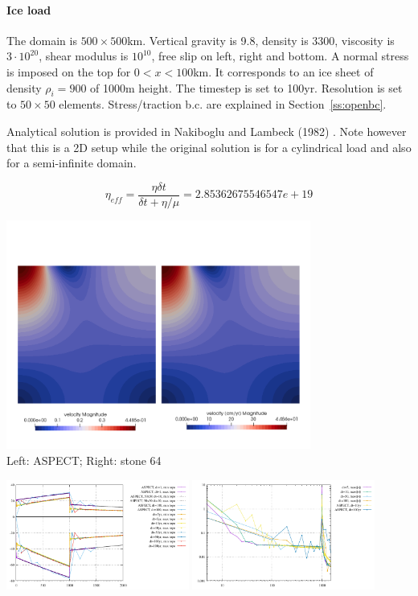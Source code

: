 \newpage
\paragraph{Ice load}

The domain is $500\times500$km. Vertical gravity is 9.8, density is 3300, viscosity 
is $3\cdot10^{20}$, shear modulus is $10^{10}$, free slip on left, right and bottom. 
A normal stress is imposed on the top for $0<x<100$km. It corresponds to 
an ice sheet of density $\rho_i=900$ of 1000m height. 
The timestep is set to 100yr. Resolution is set to $50\times50$ elements.
Stress/traction b.c. are explained in Section~\ref{ss:openbc}.

Analytical solution is provided in Nakiboglu and Lambeck (1982) \cite{nala82}. 
Note however that this is a 2D setup while the original solution is for a 
cylindrical load and also for a semi-infinite domain.

\[
\eta_{eff} = \frac{\eta \delta t}{\delta t + \eta/\mu}
= 2.85362675546547e+19
\]

\begin{center}
\includegraphics[width=10cm]{python_codes/fieldstone_64/results/icesheetload/vel}\\
{\captionfont Left: ASPECT; Right: stone 64}
\end{center}


\begin{center}
\includegraphics[width=6cm]{python_codes/fieldstone_64/results/icesheetload/topo3}
\includegraphics[width=6cm]{python_codes/fieldstone_64/results/icesheetload/vel_stats}
\end{center}

